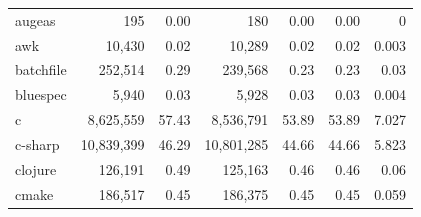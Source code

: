 \documentclass[10pt]{article} %
\begin{document}
\begin{table}[t]
{\begin{tabular}{@{\extracolsep{3pt}}lrrrrrr@{}}
augeas                   & 195                                       & 0.00                                   & 180                                                    & 0.00                                                & 0.00                       & 0                              \\
awk                      & 10,430                                    & 0.02                                   & 10,289                                                 & 0.02                                                & 0.02                       & 0.003                          \\
batchfile                & 252,514                                   & 0.29                                   & 239,568                                                & 0.23                                                & 0.23                       & 0.03                           \\
bluespec                 & 5,940                                     & 0.03                                   & 5,928                                                  & 0.03                                                & 0.03                       & 0.004                          \\
c                        & 8,625,559                                 & 57.43                                  & 8,536,791                                              & 53.89                                               & 53.89                      & 7.027                          \\
c-sharp                  & 10,839,399                                & 46.29                                  & 10,801,285                                             & 44.66                                               & 44.66                      & 5.823                          \\
clojure                  & 126,191                                   & 0.49                                   & 125,163                                                & 0.46                                                & 0.46                       & 0.06                           \\
cmake                    & 186,517                                   & 0.45                                   & 186,375                                                & 0.45                                                & 0.45                       & 0.059                          \\

\end{tabular}}
\end{table}
\end{document}
